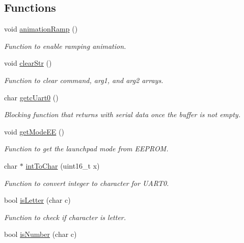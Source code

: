 \subsection*{Functions}
\begin{DoxyCompactItemize}
\item 
void \mbox{\hyperlink{satej__matthew_8c_ae9ae5be10d7512aa7f78c8cc37cd8bb8}{animation\+Ramp}} ()
\begin{DoxyCompactList}\small\item\em Function to enable ramping animation. \end{DoxyCompactList}\item 
void \mbox{\hyperlink{satej__matthew_8c_a595edd7ef79a70fc4dccbca4b2cf0deb}{clear\+Str}} ()
\begin{DoxyCompactList}\small\item\em Function to clear command, arg1, and arg2 arrays. \end{DoxyCompactList}\item 
char \mbox{\hyperlink{satej__matthew_8c_af4ecad8706d9dfd110e226f4457161e0}{getc\+Uart0}} ()
\begin{DoxyCompactList}\small\item\em Blocking function that returns with serial data once the buffer is not empty. \end{DoxyCompactList}\item 
void \mbox{\hyperlink{satej__matthew_8c_a19138fc0f5846980204bb7be7e119d56}{get\+Mode\+EE}} ()
\begin{DoxyCompactList}\small\item\em Function to get the launchpad mode from E\+E\+P\+R\+OM. \end{DoxyCompactList}\item 
char $\ast$ \mbox{\hyperlink{satej__matthew_8c_a48ff33038777eac27bf41ff14b9368bf}{int\+To\+Char}} (uint16\+\_\+t x)
\begin{DoxyCompactList}\small\item\em Function to convert integer to character for U\+A\+R\+T0. \end{DoxyCompactList}\item 
bool \mbox{\hyperlink{satej__matthew_8c_a19ec769227acc123bfe1e2d225a211cb}{is\+Letter}} (char c)
\begin{DoxyCompactList}\small\item\em Function to check if character is letter. \end{DoxyCompactList}\item 
bool \mbox{\hyperlink{satej__matthew_8c_a65b1640156c68ea7687a41428022c1d8}{is\+Number}} (char c)

\end{DoxyCompactItemize}
